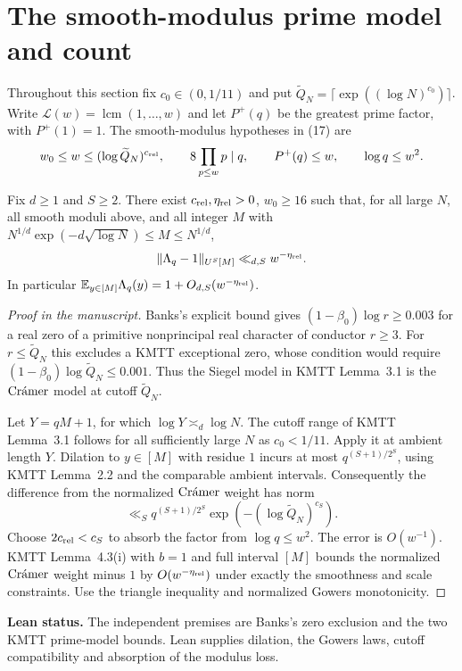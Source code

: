 \section{The smooth-modulus prime model and count}

Throughout this section fix $c_0\in(0,1/11)$ and put
$\widetilde Q_N=\lceil\exp((\log N)^{c_0})\rceil$.
Write $\mathcal L(w)=\operatorname{lcm}(1,\ldots,w)$ and let
$P^+(q)$ be the greatest prime factor, with $P^+(1)=1$.
The smooth-modulus hypotheses in (17) are
\[
 w_0\le w\le(\log\widetilde Q_N)^{c_{\rm rel}},\qquad
 8\prod_{p\le w}p\mid q,\qquad P^+(q)\le w,\qquad
 \log q\le w^2.
\]

\begin{proposition}\label{p:high-order-relative-prime}
\leanok
{}
Fix $d\ge1$ and $S\ge2$. There exist
$c_{\rm rel},\eta_{\rm rel}>0$, $w_0\ge16$ such that, for all
large $N$, all smooth moduli above, and all integer $M$ with
$N^{1/d}\exp(-d\sqrt{\log N})\le M\le N^{1/d}$,
\[
 \lVert\Lambda_q-1\rVert_{U^S[M]}\ll_{d,S}w^{-\eta_{\rm rel}}.
\]
In particular $\mathbb E_{y\in[M]}\Lambda_q(y)=1+O_{d,S}(w^{-\eta_{\rm rel}})$.
\end{proposition}
\begin{proof}[Proof in the manuscript]
\leanok
Banks's explicit bound gives $(1-\beta_0)\log r\ge0.003$
for a real zero of a primitive nonprincipal real character of
conductor $r\ge3$. For $r\le\widetilde Q_N$ this excludes a
KMTT exceptional zero, whose condition would require
$(1-\beta_0)\log\widetilde Q_N\le0.001$.
Thus the Siegel model in KMTT Lemma~3.1 is the
$\textup{Cr\'amer}$ model at cutoff $\widetilde Q_N$.

Let $Y=qM+1$, for which $\log Y\asymp_d\log N$.
The cutoff range of KMTT Lemma~3.1 follows for all sufficiently
large $N$ as $c_0<1/11$. Apply it at ambient length $Y$.
Dilation to $y\in[M]$ with residue $1$ incurs at most
$q^{(S+1)/2^S}$, using KMTT Lemma~2.2 and the comparable
ambient intervals. Consequently the difference from the normalized
$\textup{Cr\'amer}$ weight has norm
\[
 \ll_S q^{(S+1)/2^S}\exp(- (\log\widetilde Q_N)^{c_S}).
\]
Choose $2c_{\rm rel}<c_S$ to absorb the factor from $\log q\le w^2$.
The error is $O(w^{-1})$.
KMTT Lemma~4.3(i) with $b=1$ and full interval $[M]$
bounds the normalized $\textup{Cr\'amer}$ weight minus $1$ by
$O(w^{-\eta_{\rm rel}})$ under exactly the smoothness and
scale constraints. Use the triangle inequality and normalized
Gowers monotonicity.
\end{proof}
\noindent\textbf{Lean status.} The independent premises are Banks's
zero exclusion and the two KMTT prime-model bounds. Lean supplies
dilation, the Gowers laws, cutoff compatibility and absorption of the
modulus loss.

